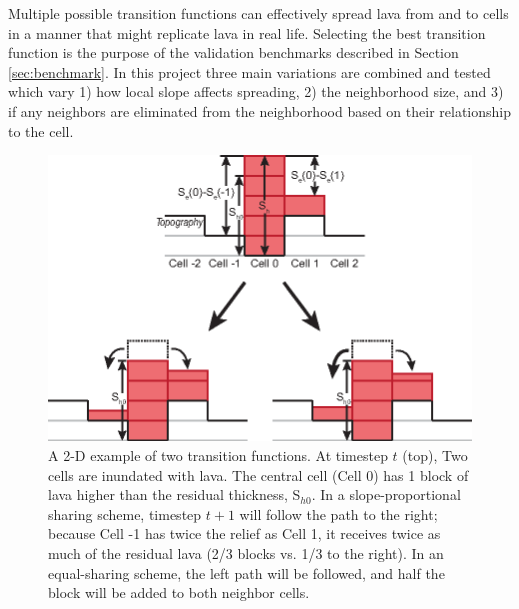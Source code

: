 \documentclass[12pt,letter]{article}
\begin{document}
		Multiple possible transition functions can effectively spread lava from and to cells in a manner that might replicate lava in real life. Selecting the best transition function is the purpose of the validation benchmarks described in Section \ref{sec:benchmark}. In this project three main variations are combined and tested which vary 1) how local slope affects spreading, 2) the neighborhood size, and 3) if any neighbors are eliminated from the neighborhood based on their relationship to the cell.
		
		\begin{figure}[!h]
			\centering
			\includegraphics[width=0.5\linewidth]{figures/slope-proportional-example}
			\caption{A 2-D example of two transition functions. At timestep $t$ (top), Two cells are inundated with lava. The central cell (Cell 0) has 1 block of lava higher than the residual thickness, S$_{h0}$. In a slope-proportional sharing scheme, timestep $t+1$ will follow the path to the right; because Cell -1 has twice the relief as Cell 1, it receives twice as much of the residual lava (2/3 blocks vs. 1/3 to the right). In an equal-sharing scheme, the left path will be followed, and half the block will be added to both neighbor cells.}
			\label{fig_BernieSanders}
		\end{figure}
		
\end{document}
